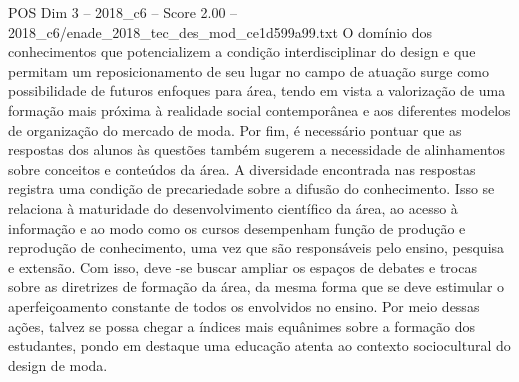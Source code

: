 \begin{textsample}{POS Dim 3 – 2018\_c6 – Score 2.00 – 2018\_c6/enade\_2018\_tec\_des\_mod\_ce1d599a99.txt}
O domínio dos conhecimentos que potencializem a condição interdisciplinar do design e que permitam um reposicionamento de seu lugar no campo de atuação surge como possibilidade de futuros enfoques para área, tendo em vista a valorização de uma formação mais próxima à realidade social contemporânea e aos diferentes modelos de organização do mercado de moda.
Por fim, é necessário pontuar que as respostas dos alunos às questões também sugerem a necessidade de alinhamentos sobre conceitos e conteúdos da área.
A diversidade encontrada nas respostas registra uma condição de precariedade sobre a difusão do conhecimento.
Isso se relaciona à maturidade do desenvolvimento científico da área, ao acesso à informação e ao modo como os cursos desempenham função de produção e reprodução de conhecimento, uma vez que são responsáveis pelo ensino, pesquisa e extensão.
Com isso, deve -se buscar ampliar os espaços de debates e trocas sobre as diretrizes de formação da área, da mesma forma que se deve estimular o aperfeiçoamento constante de todos os envolvidos no ensino.
Por meio dessas ações, talvez se possa chegar a índices mais equânimes sobre a formação dos estudantes, pondo em destaque uma educação atenta ao contexto sociocultural do design de moda.

\end{textsample}

